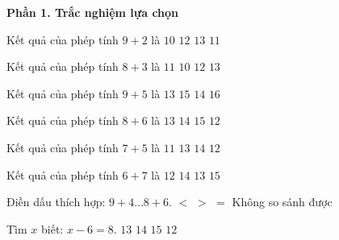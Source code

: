 \textbf{Phần 1. Trắc nghiệm lựa chọn}

\begin{ex} %
Kết quả của phép tính $9 + 2$ là
\choice
{$10$}
{$12$}
{$13$}
{\True $11$}
\end{ex}

\begin{ex} %
Kết quả của phép tính $8 + 3$ là
\choice
{\True $11$}
{$10$}
{$12$}
{$13$}
\end{ex}

\begin{ex} %
Kết quả của phép tính $9 + 5$ là
\choice
{$13$}
{$15$}
{\True $14$}
{$16$}
\end{ex}

\begin{ex} %
Kết quả của phép tính $8 + 6$ là
\choice
{$13$}
{\True $14$}
{$15$}
{$12$}
\end{ex}

\begin{ex} %
Kết quả của phép tính $7 + 5$ là
\choice
{$11$}
{$13$}
{$14$}
{\True $12$}
\end{ex}

\begin{ex} %
Kết quả của phép tính $6 + 7$ là
\choice
{$12$}
{$14$}
{\True $13$}
{$15$}
\end{ex}

\begin{ex} %
Điền dấu thích hợp: $9 + 4 \dots 8 + 6$.
\choice
{\True $<$}
{$>$}
{$=$}
{Không so sánh được}
\end{ex}

\begin{ex} %
Tìm $x$ biết: $x - 6 = 8$.
\choice
{$13$}
{\True $14$}
{$15$}
{$12$}
\end{ex}

